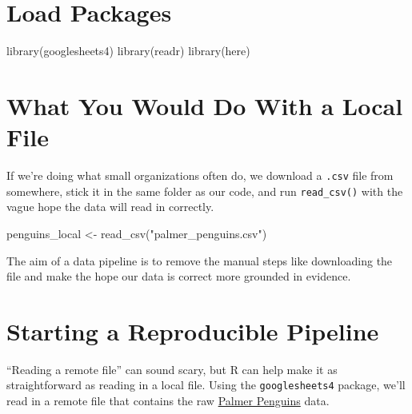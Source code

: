 \documentclass[
  letterpaper,
  DIV=11,
  numbers=noendperiod]{scrreprt}
\newenvironment{Shaded}{\begin{snugshade}}{\end{snugshade}}
\newcommand{\FunctionTok}[1]{\textcolor[rgb]{0.28,0.35,0.67}{#1}}
\newcommand{\NormalTok}[1]{\textcolor[rgb]{0.00,0.23,0.31}{#1}}
\newcommand{\OtherTok}[1]{\textcolor[rgb]{0.00,0.23,0.31}{#1}}
\newcommand{\StringTok}[1]{\textcolor[rgb]{0.13,0.47,0.30}{#1}}
\begin{document}
\hypertarget{load-packages}{%
\section{Load Packages}\label{load-packages}}

\begin{Shaded}
\begin{Highlighting}[]
\FunctionTok{library}\NormalTok{(googlesheets4)}
\FunctionTok{library}\NormalTok{(readr)}
\FunctionTok{library}\NormalTok{(here)}
\end{Highlighting}
\end{Shaded}

\hypertarget{what-you-would-do-with-a-local-file}{%
\section{What You Would Do With a Local
File}\label{what-you-would-do-with-a-local-file}}

If we're doing what small organizations often do, we download a
\texttt{.csv} file from somewhere, stick it in the same folder as our
code, and run \texttt{read\_csv()} with the vague hope the data will
read in correctly.

\begin{Shaded}
\begin{Highlighting}[]
\NormalTok{penguins\_local }\OtherTok{\textless{}{-}} \FunctionTok{read\_csv}\NormalTok{(}\StringTok{"palmer\_penguins.csv"}\NormalTok{)}
\end{Highlighting}
\end{Shaded}

The aim of a data pipeline is to remove the manual steps like
downloading the file and make the hope our data is correct more grounded
in evidence.

\hypertarget{starting-a-reproducible-pipeline}{%
\section{Starting a Reproducible
Pipeline}\label{starting-a-reproducible-pipeline}}

``Reading a remote file'' can sound scary, but R can help make it as
straightforward as reading in a local file. Using the
\texttt{googlesheets4} package, we'll read in a remote file that
contains the raw
\href{https://allisonhorst.github.io/palmerpenguins/}{Palmer Penguins}
data.
\end{document}
